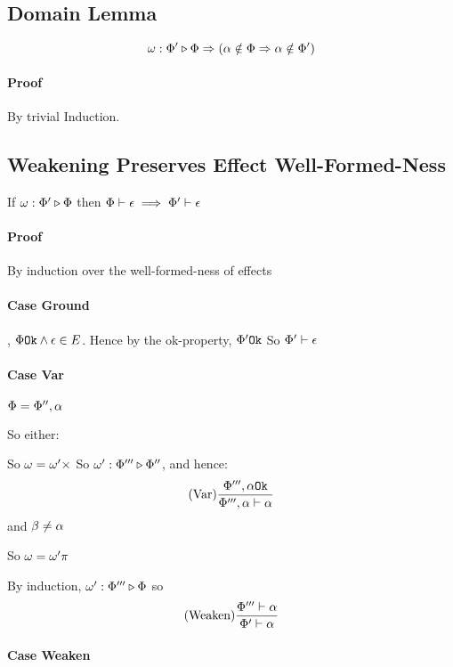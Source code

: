 {    \subsection{Domain Lemma}

    $$\omega : \Phi' \triangleright \Phi \Rightarrow (\alpha\notin\Phi \Rightarrow \alpha\notin\Phi')$$

    \paragraph{Proof}
    By trivial Induction.
   
    \subsection{Weakening Preserves Effect Well-Formed-Ness}
    If $\omega : \Phi' \triangleright \Phi$ then $\Phi\vdash \epsilon\implies\Phi'\vdash \epsilon$

    \paragraph{Proof}
    By induction over the well-formed-ness of effects
    \paragraph{Case Ground}
    \bi, $\Phi \texttt{Ok}\wedge\epsilon\in E$.
    Hence by the ok-property, $\Phi' \texttt{Ok}$
    So $\Phi'\vdash \epsilon$

    \paragraph{Case Var}

    $\Phi = \Phi'', \alpha$

    So either:

        So $\omega = \omega'\times$
        So $\omega' : \Phi''' \triangleright \Phi''$, and hence:
        \begin{equation}
            (\text{Var}) \frac{\Phi''', \alpha \texttt{Ok}}{\Phi''',\alpha\vdash \alpha}
        \end{equation}
     and $\beta \neq\alpha$

    So $\omega = \omega'\pi$

    By induction, $\omega' : \Phi''' \triangleright \Phi$
    so \begin{equation}
        (\text{Weaken}) \frac{\Phi'''\vdash \alpha}{\Phi'\vdash \alpha}
    \end{equation}

    \paragraph{Case Weaken}

}
